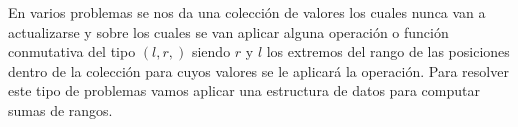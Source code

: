 En varios problemas se nos da una colección de valores los cuales nunca van a actualizarse y sobre los cuales se van aplicar alguna operación o función conmutativa del tipo $(l,r,)$ siendo $r$ y $l$ los extremos del rango de las posiciones dentro de la colección para cuyos valores se le aplicará la operación. Para resolver este tipo de problemas vamos aplicar una estructura de datos para computar sumas de rangos.